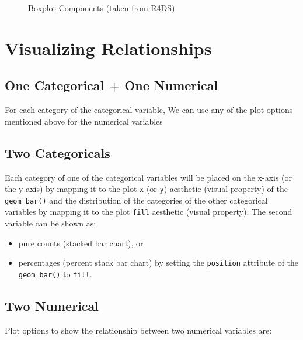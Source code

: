\documentclass[
  letterpaper,
  DIV=11,
  numbers=noendperiod]{scrreprt}
\providecommand{\tightlist}{%
  \setlength{\itemsep}{0pt}\setlength{\parskip}{0pt}}\usepackage{longtable,booktabs,array}
\begin{document}
\begin{tcolorbox}
\begin{figure}[H]
{}

\caption{\label{fig-boxplot}Boxplot Components (taken from
\href{https://r4ds.hadley.nz/data-visualize\#visualizing-relationships}{R4DS})}

\end{figure}%

\end{tcolorbox}

\section{Visualizing Relationships}\label{visualizing-relationships}

\subsection{One Categorical + One
Numerical}\label{one-categorical-one-numerical}

For each category of the categorical variable, We can use any of the
plot options mentioned above for the numerical variables

\subsection{Two Categoricals}\label{two-categoricals}

Each category of one of the categorical variables will be placed on the
x-axis (or the y-axis) by mapping it to the plot \texttt{x} (or
\texttt{y}) aesthetic (visual property) of the \texttt{geom\_bar()} and
the distribution of the categories of the other categorical variables by
mapping it to the plot \texttt{fill} aesthetic (visual property). The
second variable can be shown as:

\begin{itemize}
\tightlist
\item
  pure counts (stacked bar chart), or
\item
  percentages (percent stack bar chart) by setting the \texttt{position}
  attribute of the \texttt{geom\_bar()} to \texttt{fill}.
\end{itemize}

\subsection{Two Numerical}\label{two-numerical}

Plot options to show the relationship between two numerical variables
are:
\end{document}
